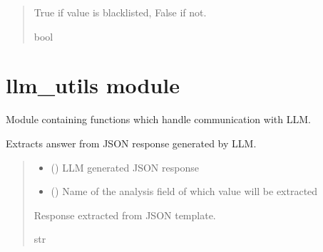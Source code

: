 \documentclass[letterpaper,10pt,english]{sphinxmanual}
\begin{document}
\begin{fulllineitems}
\begin{fulllineitems}
\begin{quote}
\begin{description}
\sphinxAtStartPar
True if value is blacklisted, False if not.

\sphinxAtStartPar
bool

\end{description}\end{quote}

\end{fulllineitems}


\end{fulllineitems}


\sphinxstepscope


\section{llm\_utils module}
\label{\detokenize{llm_utils:module-llm_utils}}\label{\detokenize{llm_utils:llm-utils-module}}\label{\detokenize{llm_utils::doc}}
\sphinxAtStartPar
Module containing functions which handle communication with LLM.

\begin{fulllineitems}
\label{\detokenize{llm_utils:llm_utils.extract_answer}}
\pysigstartsignatures
\pysiglinewithargsret
{}
{\sphinxparamcomma {}}
{}
\pysigstopsignatures
\sphinxAtStartPar
Extracts answer from JSON response generated by LLM.
\begin{quote}\begin{description}
\begin{itemize}
\item {} 
\sphinxAtStartPar
{} () \textendash{} LLM generated JSON response

\item {} 
\sphinxAtStartPar
{} () \textendash{} Name of the analysis field of which value will be extracted

\end{itemize}

\sphinxAtStartPar
Response extracted from JSON template.

\sphinxAtStartPar
str

\end{description}\end{quote}

\end{fulllineitems}
\end{document}
